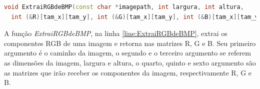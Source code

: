 

\begin{lstlisting}[label={func:ExtraiRGBdeBMP},language=C++]
void ExtraiRGBdeBMP(const char *imagepath, int largura, int altura, 
  int (&R)[tam_x][tam_y], int (&G)[tam_x][tam_y], int (&B)[tam_x][tam_y])
\end{lstlisting}

A função \emph{ExtraiRGBdeBMP}, na linha \ref{line:ExtraiRGBdeBMP}, extrai os componentes RGB de uma imagem e retorna nas matrizes R, G e B. Seu primeiro argumento é o caminho da imagem, o segundo e o terceiro argumento se referem as dimensões da imagem, largura e altura, o quarto, quinto e sexto argumento são as matrizes que irão receber os componentes da imagem, respectivamente R, G e B.
